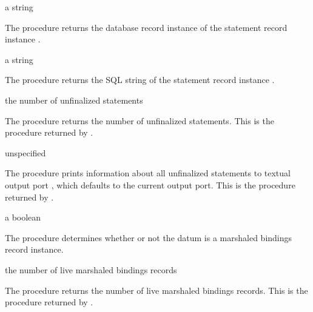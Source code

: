 \begin{procedure}
\end{procedure}
\returns{} a string

The  procedure returns the database record
instance of the statement record instance .

\begin{procedure}
\end{procedure}
\returns{} a string

The  procedure returns the SQL string of the
statement record instance .

\begin{procedure}
\end{procedure}
\returns{} the number of unfinalized statements

The  procedure returns the number of unfinalized
statements.
This is the procedure returned by .

\begin{procedure}
\end{procedure}
\returns{} unspecified

The  procedure prints information about all
unfinalized statements to textual output port , which defaults
to the current output port.
This is the procedure returned by .

\begin{procedure}
\end{procedure}
\returns{} a boolean

The  procedure determines whether or not the datum
 is a marshaled bindings record instance.

\begin{procedure}
\end{procedure}
\returns{} the number of live marshaled bindings records

The  procedure returns the number of live marshaled
bindings records.
This is the procedure returned by .

